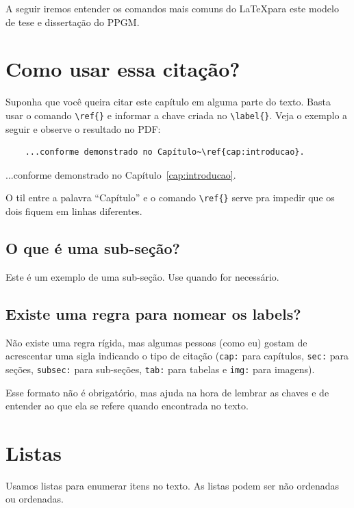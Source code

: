 A seguir iremos entender os comandos mais comuns do \LaTeX\space para este modelo de tese e dissertação do PPGM.

\section{Como usar essa citação?}
\label{sec:como_usar_essa_citacao}

Suponha que você queira citar este capítulo em alguma parte do texto. Basta usar o comando \verb=\ref{}= e informar a chave criada no \verb=\label{}=. Veja o exemplo a seguir e observe o resultado no PDF:

\begin{verbatim}
    ...conforme demonstrado no Capítulo~\ref{cap:introducao}.
\end{verbatim}

...conforme demonstrado no Capítulo~\ref{cap:introducao}.

O til entre a palavra ``Capítulo'' e o comando \verb=\ref{}= serve pra impedir que os dois fiquem em linhas diferentes.

\subsection{O que é uma sub-seção?}
\label{subsec:o_que_e_subsecao}

Este é um exemplo de uma sub-seção. Use quando for necessário.

\subsection{Existe uma regra para nomear os labels?}
\label{subsec:regra_labels}

Não existe uma regra rígida, mas algumas pessoas (como eu) gostam de acrescentar uma sigla indicando o tipo de citação (\verb=cap:= para capítulos, \verb=sec:= para seções, \verb=subsec:= para sub-seções, \verb=tab:= para tabelas e \verb=img:= para imagens).

Esse formato não é obrigatório, mas ajuda na hora de lembrar as chaves e de entender ao que ela se refere quando encontrada no texto.

\section{Listas}
\label{sec:listas}

Usamos listas para enumerar itens no texto. As listas podem ser não ordenadas ou ordenadas.

